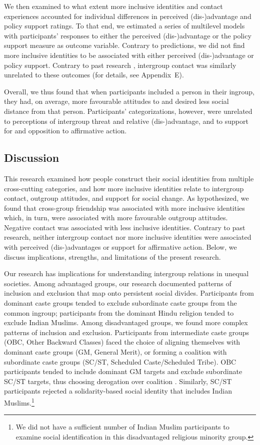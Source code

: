 \documentclass[12pt, a4paper]{article}
\begin{document}
We then examined to what extent more inclusive identities and contact experiences accounted for individual differences in perceived (dis-)advantage and policy support ratings. To that end, we estimated a series of multilevel models with participants' responses to either the perceived (dis-)advantage or the policy support measure as outcome variable. Contrary to predictions, we did not find more inclusive identities to be associated with either perceived (dis-)advantage or policy support. Contrary to past research \cite{dixon_beyond_2012}, intergroup contact was similarly unrelated to these outcomes (for details, see Appendix~E). 

Overall, we thus found that when participants included a person in their ingroup, they had, on average, more favourable attitudes to and desired less social distance from that person. Participants' categorizations, however, were unrelated to perceptions of intergroup threat and relative (dis-)advantage, and to support for and opposition to affirmative action.

\subsection{Discussion}

This research examined how people construct their social identities from multiple cross-cutting categories, and how more inclusive identities relate to intergroup contact, outgroup attitudes, and support for social change. As hypothesized, we found that cross-group friendship was associated with more inclusive identities which, in turn, were associated with more favourable outgroup attitudes. Negative contact was associated with less inclusive identities. Contrary to past research, neither intergroup contact nor more inclusive identities were associated with perceived (dis-)advantages or support for affirmative action. Below, we discuss implications, strengths, and limitations of the present research.

Our research has implications for understanding intergroup relations in unequal societies. Among advantaged groups, our research documented patterns of inclusion and exclusion that map onto persistent social divides. Participants from dominant caste groups tended to exclude subordinate caste groups from the common ingroup; participants from the dominant Hindu religion tended to exclude Indian Muslims. Among disadvantaged groups, we found more complex patterns of inclusion and exclusion. Participants from intermediate caste groups (OBC, Other Backward Classes) faced the choice of aligning themselves with dominant caste groups (GM, General Merit), or forming a coalition with subordinate caste groups (SC/ST, Scheduled Caste/Scheduled Tribe). OBC participants tended to include dominant GM targets and exclude subordinate SC/ST targets, thus choosing derogation over coalition \cite{craig_coalition_2012}. Similarly, SC/ST participants rejected a solidarity-based social identity that includes Indian Muslims.\footnote{We did not have a sufficient number of Indian Muslim participants to examine social identification in this disadvantaged religious minority group.}
\end{document}

